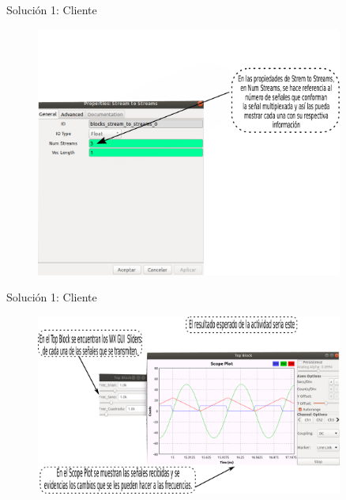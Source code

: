 \begin{frame}{Solución 1: Cliente }
\begin{figure}[H]
	\vspace{-3mm}
	\centering
	\includegraphics[width=0.9\textwidth]{soluciones/actividad-1-1/pdf/Actividad1_5.pdf}
\end{figure}
\end{frame}
\begin{frame}{Solución 1: Cliente }
\begin{figure}[H]
	\vspace{-3mm}
	\centering
	\includegraphics[width=0.9\textwidth]{soluciones/actividad-1-1/pdf/Actividad1_6.pdf}
\end{figure}
\end{frame}
